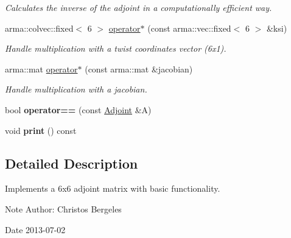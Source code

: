 \begin{DoxyCompactItemize}
\begin{DoxyCompactList}\small\item\em Calculates the inverse of the adjoint in a computationally efficient way. \end{DoxyCompactList}\item 
arma\+::colvec\+::fixed$<$ 6 $>$ \hyperlink{class_adjoint_a7f124bcc9d1223500bcb50b136e4ab3e}{operator$\ast$} (const arma\+::vec\+::fixed$<$ 6 $>$ \&ksi)
\begin{DoxyCompactList}\small\item\em Handle multiplication with a twist coordinates vector (6x1). \end{DoxyCompactList}\item 
arma\+::mat \hyperlink{class_adjoint_ac3e9632ce00b2c2b4b33eb5624898a2e}{operator$\ast$} (const arma\+::mat \&jacobian)
\begin{DoxyCompactList}\small\item\em Handle multiplication with a jacobian. \end{DoxyCompactList}\item 
\hypertarget{class_adjoint_aebee90d2631fae63268ce056cd440c5b}{bool {\bfseries operator==} (const \hyperlink{class_adjoint}{Adjoint} \&A)}\label{class_adjoint_aebee90d2631fae63268ce056cd440c5b}

\item 
\hypertarget{class_adjoint_aa8d7c09bbeaec0b1fbbc6258bfb37b37}{void {\bfseries print} () const }\label{class_adjoint_aa8d7c09bbeaec0b1fbbc6258bfb37b37}

\end{DoxyCompactItemize}


\subsection{Detailed Description}
Implements a 6x6 adjoint matrix with basic functionality. 

\begin{DoxyNote}{Note}
Author\+: Christos Bergeles 
\end{DoxyNote}
\begin{DoxyDate}{Date}
2013-\/07-\/02 
\end{DoxyDate}


